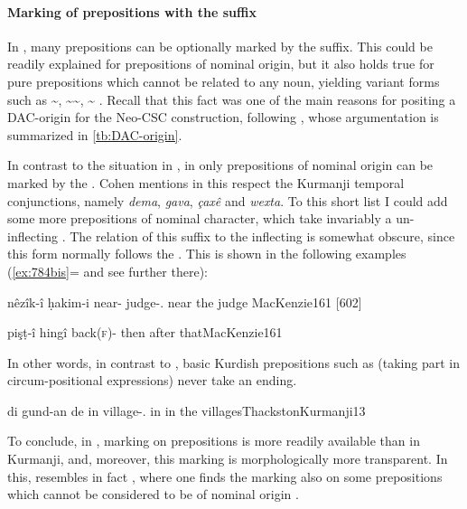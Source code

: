 \paragraph{Marking of prepositions with the \cst* suffix}

In , many prepositions can be optionally marked by the \cst* suffix. This could be readily explained for prepositions of nominal origin, but it also holds true for {pure prepositions} which cannot be related to any noun, yielding variant forms such as \~, \~\~, \~ \citep[79]{GoldenbergEarly}. Recall that this fact was one of the main reasons for positing a DAC-origin for the Neo-CSC construction, following \citet{MengozziExtended}, whose argumentation is summarized in \vref{tb:DAC-origin}. 









In contrast to the situation in , in \Kur only prepositions of nominal origin can be marked by the \ez*. 
Cohen mentions in this respect the Kurmanji temporal conjunctions, namely \textit{dema}, \textit{gava}, \textit{çaxê} and \textit{wexta}.  To this short list I could  add some more prepositions of nominal character, which take invariably a un-inflecting \ez* {}. The relation of this suffix to the inflecting \ez* is somewhat obscure, since this form normally follows the  . This is shown in the following examples (\ref{ex:784bis}= and see further there):

{nêzîk-î ḥakim-i}
{near-\ez{} judge-\obl.\masc}
{near the judge}
{MacKenzie}{161 {[602]}} 

{pişṭ-î hingî}
{back(\textsc{f})-\ez{} then}
{after that}{MacKenzie}{161}


In other words, in contrast to , basic Kurdish prepositions such as  (taking part in circum-positional expressions) never take an \ez* ending.


{di gund-an de}
{in village-\pl.\obl{} in}
{in the villages}{ThackstonKurmanji}{13}

To conclude,  in , \cst* marking on prepositions is more readily available than in Kurmanji, and, moreover, this marking is morphologically more transparent. In this,  resembles in fact \Per, where one finds the \ez* marking also on some prepositions which cannot be considered to be of nominal origin \citep[345, example (16)]{SamvelianHead}.

